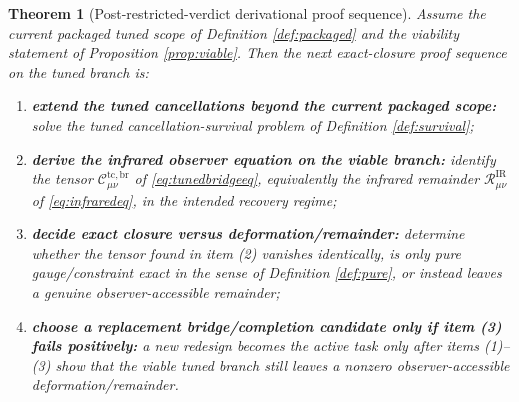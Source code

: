 \documentclass[11pt]{article}
\newtheorem{theorem}{Theorem}
\begin{document}
\begin{theorem}[Post-restricted-verdict derivational proof sequence]
\label{thm:sequence}
Assume the current packaged tuned scope of Definition \ref{def:packaged} and the viability statement of Proposition \ref{prop:viable}. Then the next exact-closure proof sequence on the tuned branch is:
\begin{enumerate}
    \item \textbf{extend the tuned cancellations beyond the current packaged scope:} solve the tuned cancellation-survival problem of Definition \ref{def:survival};
    \item \textbf{derive the infrared observer equation on the viable branch:} identify the tensor \(\mathcal C_{\mu\nu}^{\mathrm{tc,br}}\) of \eqref{eq:tunedbridgeeq}, equivalently the infrared remainder \(\mathcal R_{\mu\nu}^{\mathrm{IR}}\) of \eqref{eq:infraredeq}, in the intended recovery regime;
    \item \textbf{decide exact closure versus deformation/remainder:} determine whether the tensor found in item (2) vanishes identically, is only pure gauge/constraint exact in the sense of Definition \ref{def:pure}, or instead leaves a genuine observer-accessible remainder;
    \item \textbf{choose a replacement bridge/completion candidate only if item (3) fails positively:} a new redesign becomes the active task only after items (1)--(3) show that the viable tuned branch still leaves a nonzero observer-accessible deformation/remainder.
\end{enumerate}
\end{theorem}
\end{document}
